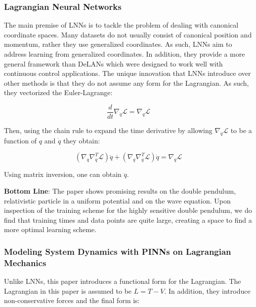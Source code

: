 \documentclass{article}
\begin{document}
\subsubsection{Lagrangian Neural Networks}

The main premise of LNNs \cite{cranmer_lagrangian_2020} is to tackle the problem of dealing with canonical coordinate spaces. Many datasets do not usually consist of canonical position and momentum, rather they use generalized coordinates. As such, LNNs aim to address learning from generalized coordinates. In addition, they provide a more general framework than DeLANs which were designed to work well with continuous control applications. The unique innovation that LNNs introduce over other methods is that they do not assume any form for the Lagrangian. As such, they vectorized the Euler-Lagrange:

\begin{equation}
\frac{d}{dt} \nabla_{\dot{q}} \mathcal{L} = \nabla_q \mathcal{L}
\label{eqn.lnn1}
\end{equation}

Then, using the chain rule to expand the time derivative by allowing $\nabla_{\dot{q}}\mathcal{L}$ to be a function of $q$ and $\dot{q}$ they obtain:

\begin{equation}
(\nabla_{\dot{q}}\nabla_{\dot{q}}^T \mathcal{L}) \ddot{q} + (\nabla_q \nabla_{\dot{q}}^T \mathcal{L})\dot{q} = \nabla_q \mathcal{L}
\end{equation}

Using matrix inversion, one can obtain $\ddot{q}$. 

\textbf{Bottom Line}: The paper shows promising results on the double pendulum, relativistic particle in a uniform potential and on the wave equation. Upon inspection of the training scheme for the highly sensitive double pendulum, we do find that training times and data points are quite large, creating a space to find a more optimal learning scheme.

\subsubsection{Modeling System Dynamics with PINNs on Lagrangian Mechanics}

Unlike LNNs, this paper introduces a functional form for the Lagrangian. The Lagrangian in this paper \cite{roehrl_modeling_2020} is assumed to be $L = T -V$. In addition, they introduce non-conservative forces and the final form is:
\end{document}
